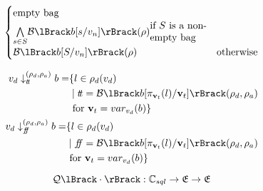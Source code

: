 \begin{align}
\begin{cases}
\begin{split}
                  & \text{empty bag}
        \end{split} \\
        \underset{s \in S}{\bigwedge}\boolsem{b[s/v_n]}(\environment) \begin{split}
                                                                          & \text{if $S$ is a non-} \\
                                                                          & \text{empty bag}
        \end{split} \\
        \boolsem{b[S/v_n]}(\environment) & \text{otherwise} \\
    \end{cases} \\
\end{align}

\begin{align}
    \begin{split}
        v_d \downarrow_{\true}^{(\rho_d, \rho_a)} b = &\{ l \in \rho_d(v_d) \\
        &\mid \true = \boolsem{b[\pi_{\mathbf{v}_t}(l)/\mathbf{v}_t]}(\rho_d, \rho_a) \\
        &\text{ for } \mathbf{v}_t = var_{v_d}(b) \}
    \end{split}\\
    \begin{split}
        v_d \downarrow_{\false}^{(\rho_d, \rho_a)} b = &\{ l \in \rho_d(v_d) \\
        &\mid \false = \boolsem{b[\pi_{\mathbf{v}_t}(l)/\mathbf{v}_t]}(\rho_d, \rho_a) \\
        &\text{ for } \mathbf{v}_t = var_{v_d}(b) \}
    \end{split}\\
\end{align}

\begin{equation}
    \sqlsem{\cdot} : \mathbb{C}_{sql} \rightarrow \environments \rightarrow \environments\label{eq:equation14}
\end{equation}


